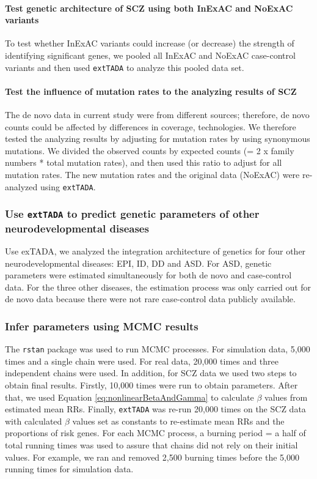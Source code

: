 \documentclass[]{article}
\begin{document}
\paragraph{Test genetic architecture of SCZ using both InExAC and
  NoExAC variants}

To test whether InExAC variants could increase (or decrease) the
strength of identifying significant genes, we pooled all InExAC and
NoExAC case-control variants and then used \texttt{extTADA} to analyze this pooled
data set.


\paragraph{Test the influence of mutation rates to the analyzing
  results of SCZ}

The de novo data in current study were from different sources;
therefore, de novo counts could be affected by differences in coverage, technologies.
We therefore tested the analyzing results by adjusting for mutation
rates by using synonymous mutations. We divided the observed counts by
expected counts (= 2 x family numbers * total mutation rates), and
then used this ratio to adjust for all mutation rates. The new
mutation rates and the original data (NoExAC) were re-analyzed using \texttt{extTADA}.


\subsubsection{Use \texttt{extTADA} to predict genetic parameters of other  neurodevelopmental diseases}

Use exTADA, we analyzed the integration architecture of genetics for
four other  neurodevelopmental diseases: EPI, ID, DD and ASD. For ASD, genetic
parameters were estimated simultaneously for both de novo and
case-control data. For the three other diseases, the estimation
process was only carried out for de novo data because there were not
rare case-control data publicly available.

\subsubsection{Infer parameters using MCMC results}

The \texttt{rstan} package \citep{carpenter2015stan} was used to run MCMC processes. For
simulation data, 5,000 times and a single chain were used. For real
data, 20,000 times and three independent chains were used. In
addition, for SCZ data we used two steps to obtain final
results. Firstly, 10,000 times were run to obtain
parameters. After that, we used Equation
\ref{eq:nonlinearBetaAndGamma} to calculate $\beta$ values
from estimated mean RRs. Finally, \texttt{extTADA} was re-run 20,000 times on the SCZ data
with calculated $\beta$ values set as constants to re-estimate mean
RRs and the proportions of risk genes. For each MCMC process, a
burning period = a half of total running times was used to assure
that chains did not rely on their initial values. For example, we ran
and removed 2,500 burning times before the 5,000 running times for simulation data.
\end{document}
